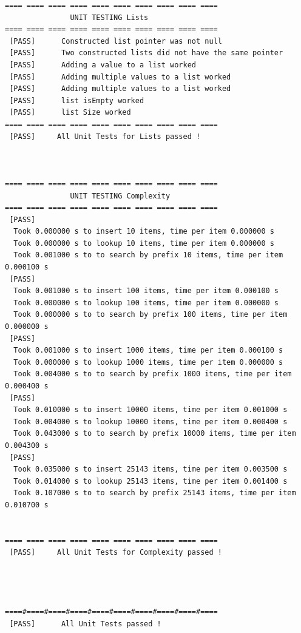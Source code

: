 \documentclass[10pt]{article} %
\begin{document}
\begin{lstlisting}
==== ==== ==== ==== ==== ==== ==== ==== ==== ==== 
               UNIT TESTING Lists 
==== ==== ==== ==== ==== ==== ==== ==== ==== ==== 
 [PASS] 	 Constructed list pointer was not null
 [PASS] 	 Two constructed lists did not have the same pointer
 [PASS] 	 Adding a value to a list worked
 [PASS] 	 Adding multiple values to a list worked
 [PASS] 	 Adding multiple values to a list worked
 [PASS] 	 list isEmpty worked
 [PASS] 	 list Size worked
==== ==== ==== ==== ==== ==== ==== ==== ==== ==== 
 [PASS] 	All Unit Tests for Lists passed ! 



==== ==== ==== ==== ==== ==== ==== ==== ==== ==== 
               UNIT TESTING Complexity 
==== ==== ==== ==== ==== ==== ==== ==== ==== ==== 
 [PASS] 	  
  Took 0.000000 s to insert 10 items, time per item 0.000000 s
  Took 0.000000 s to lookup 10 items, time per item 0.000000 s
  Took 0.001000 s to to search by prefix 10 items, time per item 0.000100 s 
 [PASS] 	  
  Took 0.001000 s to insert 100 items, time per item 0.000100 s
  Took 0.000000 s to lookup 100 items, time per item 0.000000 s
  Took 0.000000 s to to search by prefix 100 items, time per item 0.000000 s 
 [PASS] 	  
  Took 0.001000 s to insert 1000 items, time per item 0.000100 s
  Took 0.000000 s to lookup 1000 items, time per item 0.000000 s
  Took 0.004000 s to to search by prefix 1000 items, time per item 0.000400 s
 [PASS] 	  
  Took 0.010000 s to insert 10000 items, time per item 0.001000 s
  Took 0.004000 s to lookup 10000 items, time per item 0.000400 s
  Took 0.043000 s to to search by prefix 10000 items, time per item 0.004300 s 
 [PASS] 	  
  Took 0.035000 s to insert 25143 items, time per item 0.003500 s
  Took 0.014000 s to lookup 25143 items, time per item 0.001400 s
  Took 0.107000 s to to search by prefix 25143 items, time per item 0.010700 s
 

==== ==== ==== ==== ==== ==== ==== ==== ==== ==== 
 [PASS] 	All Unit Tests for Complexity passed ! 




====#====#====#====#====#====#====#====#====#==== 
 [PASS] 	 All Unit Tests passed ! 

        \end{lstlisting}
	\newpage
	
\end{document}
